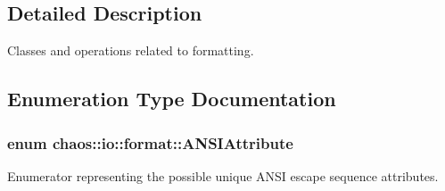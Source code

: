 \subsection{Detailed Description}
Classes and operations related to formatting. 

\subsection{Enumeration Type Documentation}
\hypertarget{namespacechaos_1_1io_1_1format_af01119682ec0bc616b49641e0c2a7ccf}{
\subsubsection[{A\-N\-S\-I\-Attribute}]{\setlength{\rightskip}{0pt plus 5cm}enum {\bf chaos\-::io\-::format\-::\-A\-N\-S\-I\-Attribute}}}\label{namespacechaos_1_1io_1_1format_af01119682ec0bc616b49641e0c2a7ccf}


Enumerator representing the possible unique A\-N\-S\-I escape sequence attributes. 

